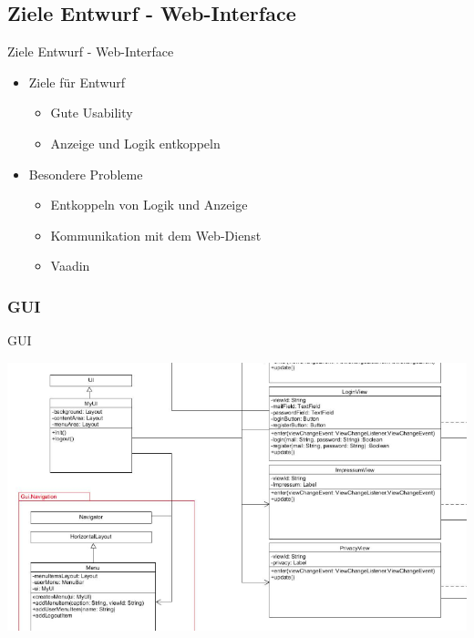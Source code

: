 \documentclass[19pt]{beamer}
\begin{document}
\subsection{Ziele Entwurf - Web-Interface}
\begin{frame}{Ziele Entwurf - Web-Interface}
    \begin{itemize}
		\item Ziele für Entwurf
		\begin{itemize}
			\item Gute Usability
			\item Anzeige und Logik entkoppeln
		\end{itemize}
    	\item Besondere Probleme
    	\begin{itemize}
			\item Entkoppeln von Logik und Anzeige
			\item Kommunikation mit dem Web-Dienst
			\item Vaadin
		\end{itemize}
    \end{itemize}
\end{frame}
\subsubsection{GUI}
\begin{frame}{GUI}
\begin{center}
\includegraphics[scale=0.35]{resources/interface_gui.png}
\end{center}
\end{frame}
\end{document}
